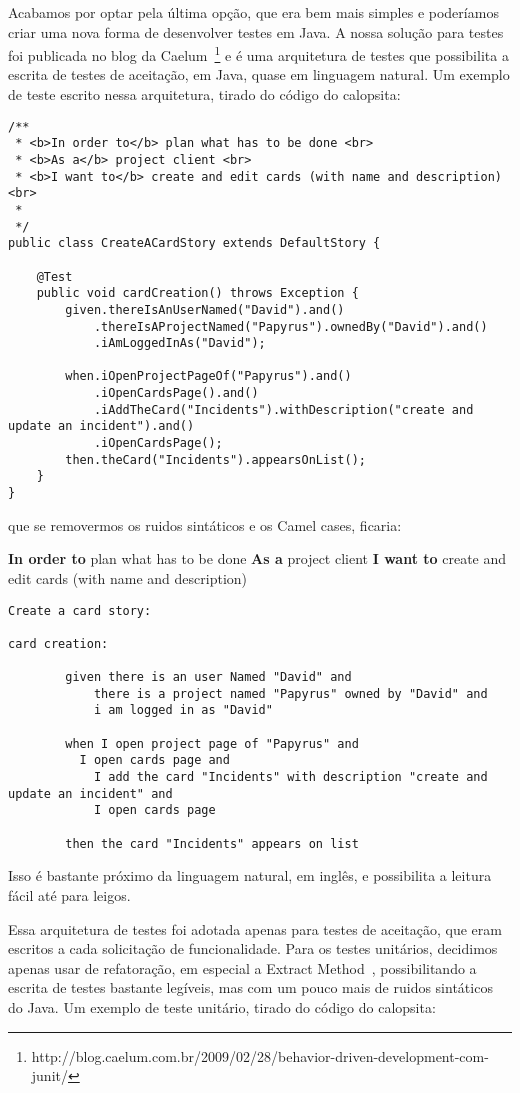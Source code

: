 Acabamos por optar pela última opção, que era bem mais simples e poderíamos criar uma nova forma de desenvolver 
testes em Java. A nossa solução para testes foi publicada no blog da Caelum~\footnote{http://blog.caelum.com.br/2009/02/28/behavior-driven-development-com-junit/} e é uma arquitetura de 
testes que possibilita a escrita de testes de aceitação, em Java, quase em linguagem natural. Um exemplo de teste 
escrito nessa arquitetura, tirado do código do calopsita:

\begin{lstlisting}
/**
 * <b>In order to</b> plan what has to be done <br>
 * <b>As a</b> project client <br>
 * <b>I want to</b> create and edit cards (with name and description) <br>
 *
 */
public class CreateACardStory extends DefaultStory {

	@Test
	public void cardCreation() throws Exception {
		given.thereIsAnUserNamed("David").and()
			.thereIsAProjectNamed("Papyrus").ownedBy("David").and()
			.iAmLoggedInAs("David");

		when.iOpenProjectPageOf("Papyrus").and()
		    .iOpenCardsPage().and()
			.iAddTheCard("Incidents").withDescription("create and update an incident").and()
			.iOpenCardsPage();
		then.theCard("Incidents").appearsOnList();
	}
}
\end{lstlisting}

que se removermos os ruidos sintáticos e os Camel cases, ficaria:

{\bf In order to} plan what has to be done
{\bf As a} project client
{\bf I want to} create and edit cards (with name and description)

\begin{verbatim}
Create a card story:

card creation:
	
		given there is an user Named "David" and
			there is a project named "Papyrus" owned by "David" and
			i am logged in as "David"

		when I open project page of "Papyrus" and
		  I open cards page and
			I add the card "Incidents" with description "create and update an incident" and
			I open cards page
			
		then the card "Incidents" appears on list
\end{verbatim}

Isso é bastante próximo da linguagem natural, em inglês, e possibilita a leitura fácil até para leigos.

Essa arquitetura de testes foi adotada apenas para testes de aceitação, que eram escritos a cada solicitação de
funcionalidade. Para os testes unitários, decidimos apenas usar de refatoração, em especial a Extract Method~\cite{refactoring}, possibilitando a escrita de testes bastante
legíveis, mas com um pouco mais de ruidos sintáticos do Java. Um exemplo de teste unitário, tirado do código do calopsita:

